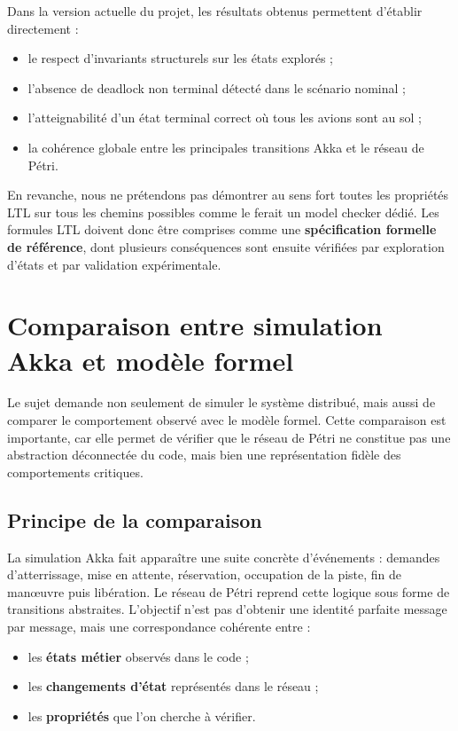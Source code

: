 \documentclass[11pt,a4paper]{article}
\begin{document}
Dans la version actuelle du projet, les résultats obtenus permettent d'établir directement :
\begin{itemize}
    \item le respect d'invariants structurels sur les états explorés ;
    \item l'absence de deadlock non terminal détecté dans le scénario nominal ;
    \item l'atteignabilité d'un état terminal correct où tous les avions sont au sol ;
    \item la cohérence globale entre les principales transitions Akka et le réseau de Pétri.
\end{itemize}

En revanche, nous ne prétendons pas démontrer au sens fort toutes les propriétés LTL sur tous les chemins possibles comme le ferait un model checker dédié. Les formules LTL doivent donc être comprises comme une \textbf{spécification formelle de référence}, dont plusieurs conséquences sont ensuite vérifiées par exploration d'états et par validation expérimentale.



\section{Comparaison entre simulation Akka et modèle formel}

Le sujet demande non seulement de simuler le système distribué, mais aussi de comparer le comportement observé avec le modèle formel. Cette comparaison est importante, car elle permet de vérifier que le réseau de Pétri ne constitue pas une abstraction déconnectée du code, mais bien une représentation fidèle des comportements critiques.

\subsection{Principe de la comparaison}

La simulation Akka fait apparaître une suite concrète d'événements : demandes d'atterrissage, mise en attente, réservation, occupation de la piste, fin de manœuvre puis libération. Le réseau de Pétri reprend cette logique sous forme de transitions abstraites. L'objectif n'est pas d'obtenir une identité parfaite message par message, mais une correspondance cohérente entre :
\begin{itemize}
    \item les \textbf{états métier} observés dans le code ;
    \item les \textbf{changements d'état} représentés dans le réseau ;
    \item les \textbf{propriétés} que l'on cherche à vérifier.
\end{itemize}
\end{document}
